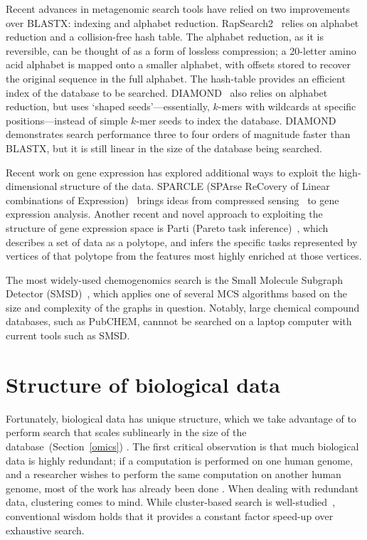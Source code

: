 \documentclass{acm_proc_article-sp}
\begin{document}
Recent advances in metagenomic search tools have relied on two improvements over
BLASTX: indexing and alphabet reduction.
RapSearch2~\cite{zhao2012rapsearch2} relies on alphabet reduction and a 
collision-free hash table.
The alphabet reduction, as it is reversible, can be thought of as a form of
lossless compression; a 20-letter amino acid alphabet is mapped onto a smaller
alphabet, with offsets stored to recover the original sequence in the full
alphabet.
The hash-table provides an efficient index of the database to be searched.
DIAMOND~\cite{buchfink2014fast} also relies on alphabet reduction, but uses
`shaped seeds'---essentially, $k$-mers with wildcards at specific positions---instead of simple $k$-mer seeds to index the database.
DIAMOND demonstrates search performance three to four orders of magnitude faster
than BLASTX, but it is still linear in the size of the database being searched.

Recent work on gene expression has explored additional ways to exploit the high-dimensional 
structure of the data.
SPARCLE (SPArse ReCovery of Linear combinations of Expression)~\cite{prat2011recovering}
brings ideas from compressed sensing~\cite{candes2005decoding} 
to gene expression analysis.
Another recent and novel approach to exploiting the structure of gene expression
space is Parti (Pareto task inference)~\cite{hart2015inferring}, which describes a set of
data as a polytope, and infers the specific tasks represented by vertices of
that polytope from the features most highly enriched at those vertices.

The most widely-used chemogenomics search is the Small Molecule Subgraph Detector 
(SMSD)~\cite{rahman2009small}, which applies one of several MCS algorithms based
on the size and complexity of the graphs in question.
Notably, large chemical compound databases, such as PubCHEM,
cannnot be searched on a laptop computer with current tools such as SMSD.


\section{Structure of biological data}\label{structure}

Fortunately, biological data has unique structure, which we 
take advantage of to perform search that scales sublinearly in the size of the database~(Section~\ref{omics}) \cite{yu2015entropy}.
The first critical observation is that
much biological data is highly redundant; if a computation is performed on one
human genome, and a researcher wishes to perform the same computation on another
human genome, most of the work has already been done \cite{loh2012compressive}.
When dealing with redundant data, clustering comes to mind.
While cluster-based search is well-studied~\cite{jardine1971use}, conventional
wisdom holds that it provides a constant factor speed-up over exhaustive search.
\end{document}
